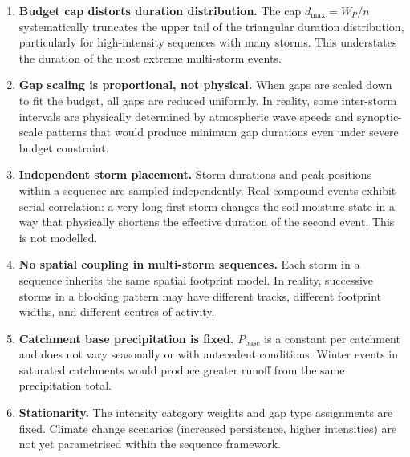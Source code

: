 \documentclass[11pt,a4paper]{article}
\begin{document}
\begin{enumerate}[nosep]
  \item \textbf{Budget cap distorts duration distribution.} The cap
        $d_{\max} = W_P / n$ systematically truncates the upper tail of the
        triangular duration distribution, particularly for high-intensity
        sequences with many storms. This understates the duration of the
        most extreme multi-storm events.

  \item \textbf{Gap scaling is proportional, not physical.} When gaps are
        scaled down to fit the budget, all gaps are reduced uniformly. In
        reality, some inter-storm intervals are physically determined by
        atmospheric wave speeds and synoptic-scale patterns that would produce
        minimum gap durations even under severe budget constraint.

  \item \textbf{Independent storm placement.} Storm durations and peak positions
        within a sequence are sampled independently. Real compound events exhibit
        serial correlation: a very long first storm changes the soil moisture
        state in a way that physically shortens the effective duration of the
        second event. This is not modelled.

  \item \textbf{No spatial coupling in multi-storm sequences.} Each storm in a
        sequence inherits the same spatial footprint model. In reality, successive
        storms in a blocking pattern may have different tracks, different footprint
        widths, and different centres of activity.

  \item \textbf{Catchment base precipitation is fixed.} $P_{\text{base}}$ is a
        constant per catchment and does not vary seasonally or with antecedent
        conditions. Winter events in saturated catchments would produce greater
        runoff from the same precipitation total.

  \item \textbf{Stationarity.} The intensity category weights and gap type
        assignments are fixed. Climate change scenarios (increased persistence,
        higher intensities) are not yet parametrised within the sequence framework.
\end{enumerate}

\mkmgovernance
\end{document}
